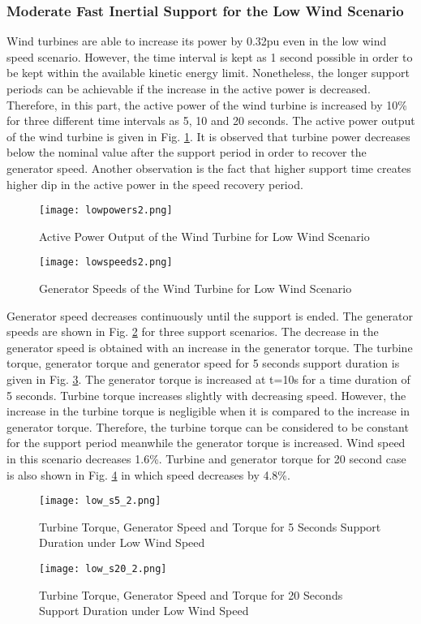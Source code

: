 \subsubsection{Moderate Fast Inertial Support for the  Low Wind Scenario}
Wind turbines are able to increase its power by 0.32pu even in the low wind speed scenario. However, the time interval is kept as 1 second possible in order to be kept within the available kinetic energy limit. Nonetheless, the longer support periods can be achievable if the increase in the active power is decreased. Therefore, in this part, the active power of the wind turbine is increased by 10\% for three different time intervals as 5, 10 and 20 seconds. The active power output of the wind turbine is given in Fig. \ref{lowactivepowers}. It is observed that turbine power decreases below the nominal value after the support period in order to recover the generator speed. Another observation is the fact that higher support time creates higher dip in the active power in the speed recovery period.\par
\begin{figure}[h]
	\centering
	\texttt{[image: lowpowers2.png]}
	\caption{Active Power Output of the Wind Turbine for Low Wind Scenario}
	\label{lowactivepowers}
\end{figure}
\begin{figure}[h]
	\centering
	\texttt{[image: lowspeeds2.png]}
	\caption{Generator Speeds of the Wind Turbine for Low Wind Scenario}
	\label{low_speeds}
\end{figure}
Generator speed decreases continuously until the support is ended. The generator speeds are shown in Fig. \ref{low_speeds} for three support scenarios. The decrease in the generator speed is obtained with an increase in the generator torque. The turbine torque, generator torque and generator speed for 5 seconds support duration is given in Fig. \ref{low_torques}. The generator torque is increased at t=10s for a time duration of 5 seconds. Turbine torque increases slightly with decreasing speed. However, the increase in the turbine torque is negligible when it is compared to the increase in generator torque. Therefore, the turbine torque can be considered to be constant for the support period meanwhile the generator torque is increased. Wind speed in this scenario decreases 1.6\%. Turbine and generator torque for 20 second case is also shown in Fig. \ref{low_torques3} in which speed decreases by 4.8\%.\par
\begin{figure}[h!]
	\centering
	\texttt{[image: low\_s5\_2.png]}
	\caption{Turbine Torque, Generator Speed and Torque for 5 Seconds Support Duration under Low Wind Speed}
	\label{low_torques}
\end{figure}
\begin{figure}[h!]
	\centering
	\texttt{[image: low\_s20\_2.png]}
	\caption{Turbine Torque, Generator Speed and Torque for 20 Seconds Support Duration under Low Wind Speed}
	\label{low_torques3}
\end{figure}
